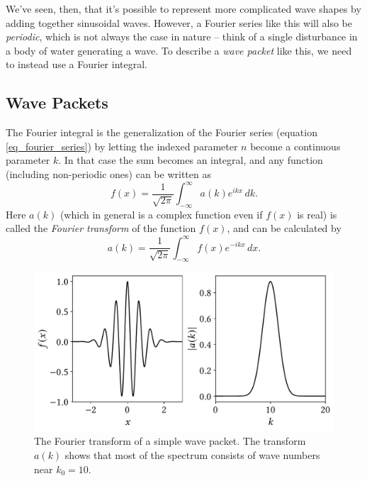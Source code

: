 We've seen, then, that it's possible to represent more complicated wave shapes by adding together sinusoidal waves.  However, a Fourier series like this will also be \emph{periodic}, which is not always the case in nature -- think of a single disturbance in a body of water generating a wave.  To describe a \emph{wave packet} like this, we need to instead use a Fourier integral.


\subsection{Wave Packets}

The Fourier integral is the generalization of the Fourier series (equation \ref{eq_fourier_series}) by letting the indexed parameter $n$ become a continuous parameter $k$.  In that case the sum becomes an integral, and any function (including non-periodic ones) can be written as
\begin{equation}
f(x) = \frac{1}{\sqrt{2\pi}} \int_{-\infty}^{\infty} a(k) e^{ikx} \, dk.
\end{equation}
Here $a(k)$ (which in general is a complex function even if $f(x)$ is real) is called the \emph{Fourier transform} of the function $f(x)$, and can be calculated by 
\[
a(k) = \frac{1}{\sqrt{2\pi}} \int_{-\infty}^{\infty} f(x) e^{-ikx} \, dx.
\]

\begin{figure}
\centering\includegraphics[width=0.8\linewidth]{Figures/Chapter5/fig_fourier_example}
\caption{The Fourier transform of a simple wave packet.  The transform $a(k)$ shows that most of the spectrum consists of wave numbers near $k_0 = 10$.}
\label{fig_fourier_example}
\end{figure}

